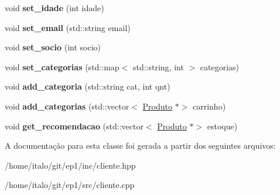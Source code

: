 \begin{DoxyCompactItemize}
\item 
\mbox{\label{class_cliente_a9f42acbe77a66b07d3b2d98bb79ee444}} 
void {\bfseries set\+\_\+idade} (int idade)
\item 
\mbox{\label{class_cliente_a7588a428be8edc0263b141049c3d3115}} 
void {\bfseries set\+\_\+email} (std\+::string email)
\item 
\mbox{\label{class_cliente_aa119e8d42b86f38a9c293f8f7e7aae01}} 
void {\bfseries set\+\_\+socio} (int socio)
\item 
\mbox{\label{class_cliente_a56cd7e779fc5b92fc51d1fe25e340cdf}} 
void {\bfseries set\+\_\+categorias} (std\+::map$<$ std\+::string, int $>$ categorias)
\item 
\mbox{\label{class_cliente_aa94393f1e6da2e82c89d83d384e0b9e9}} 
void {\bfseries add\+\_\+categoria} (std\+::string cat, int qnt)
\item 
\mbox{\label{class_cliente_a609b2a9404acd81cb19153fa61b5edd0}} 
void {\bfseries add\+\_\+categorias} (std\+::vector$<$ \hyperlink{class_produto}{Produto} $\ast$$>$ carrinho)
\item 
\mbox{\label{class_cliente_a0e98197e7452264fd968b2600c126a9e}} 
void {\bfseries get\+\_\+recomendacao} (std\+::vector$<$ \hyperlink{class_produto}{Produto} $\ast$$>$ estoque)
\end{DoxyCompactItemize}


A documentação para esta classe foi gerada a partir dos seguintes arquivos\+:\begin{DoxyCompactItemize}
\item 
/home/italo/git/ep1/inc/cliente.\+hpp\item 
/home/italo/git/ep1/src/cliente.\+cpp\end{DoxyCompactItemize}
